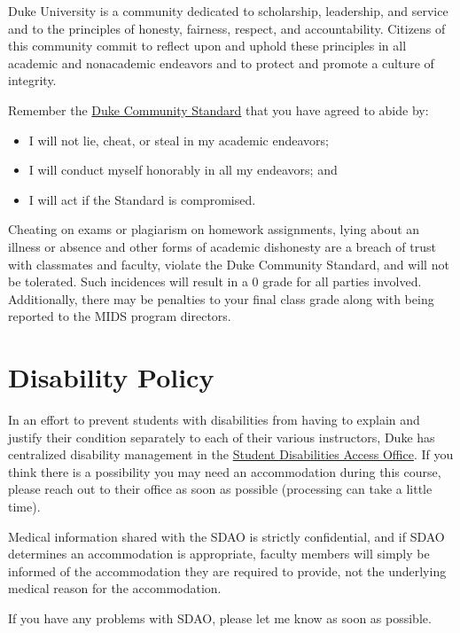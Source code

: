 \documentclass[12pt]{article}
\begin{document}
Duke University is a community dedicated to scholarship, leadership, and service and to the principles of honesty, fairness, respect, and accountability. Citizens of this community commit to reflect upon and uphold these principles in all academic and nonacademic endeavors and to protect and promote a culture of integrity.

Remember the \href{https://studentaffairs.duke.edu/conduct/about-us/duke-community-standard}{Duke Community Standard} that you have agreed to abide by:

\begin{itemize}
	\item I will not lie, cheat, or steal in my academic endeavors;
	\item I will conduct myself honorably in all my endeavors; and
	\item I will act if the Standard is compromised.
\end{itemize}

Cheating on exams or plagiarism on homework assignments, lying about an illness or absence and other forms of academic dishonesty are a breach of trust with classmates and faculty, violate the Duke Community Standard, and will not be tolerated. Such incidences will result in a 0 grade for all parties involved. Additionally, there may be penalties to your final class grade along with being reported to the MIDS program directors.

\section{Disability Policy}

In an effort to prevent students with disabilities from having to explain and justify their condition separately to each of their various instructors, Duke has centralized disability management in the \href{https://access.duke.edu/students}{Student Disabilities Access Office}. If you think there is a possibility you may need an accommodation during this course, please reach out to their office as soon as possible (processing can take a little time).

Medical information shared with the SDAO is strictly confidential, and if SDAO determines an accommodation is appropriate, faculty members will simply be informed of the accommodation they are required to provide, not the underlying medical reason for the accommodation.

If you have any problems with SDAO, please let me know as soon as possible.
\end{document}
